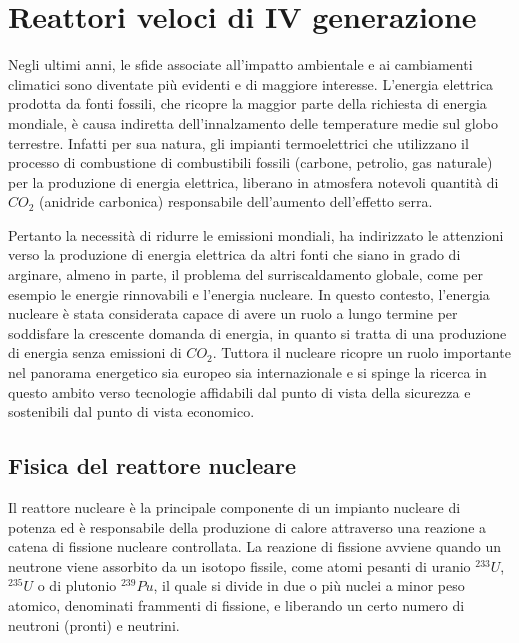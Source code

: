 \chapter{Reattori veloci di IV generazione \label{cap1}}

Negli ultimi anni, le sfide associate all'impatto ambientale e ai cambiamenti 
climatici sono diventate più evidenti e di maggiore interesse.
L'energia elettrica prodotta da fonti fossili, che ricopre la maggior parte 
della richiesta di energia mondiale, è causa indiretta dell'innalzamento delle 
temperature medie sul globo terrestre.
Infatti per sua natura, gli impianti termoelettrici che utilizzano il processo 
di combustione di combustibili fossili (carbone, petrolio, gas naturale) per la 
produzione di energia elettrica, liberano in atmosfera notevoli quantità di 
$CO_2$ (anidride carbonica) responsabile dell'aumento dell'effetto serra.

Pertanto la necessità di ridurre le emissioni mondiali, ha indirizzato le 
attenzioni verso la produzione di energia elettrica da altri fonti che siano in 
grado di arginare, almeno in parte, il problema del surriscaldamento globale, 
come per esempio le energie rinnovabili e l'energia nucleare.
In questo contesto, l'energia nucleare è stata considerata capace di avere un 
ruolo a lungo termine per soddisfare la crescente domanda di energia, in quanto 
si tratta di una produzione di energia senza emissioni di $CO_2$.
Tuttora il nucleare ricopre un ruolo importante nel panorama energetico sia 
europeo sia internazionale e si spinge la ricerca in questo ambito verso 
tecnologie affidabili dal punto di vista della sicurezza e sostenibili dal 
punto 
di vista economico. \cite{overview}

\section{Fisica del reattore nucleare}

Il reattore nucleare è la principale componente di un impianto nucleare di 
potenza ed è responsabile della produzione di calore attraverso una reazione a 
catena di fissione nucleare controllata. 
La reazione di fissione avviene quando un neutrone viene assorbito da un 
isotopo 
fissile, come atomi pesanti di uranio $^{233}U$, $^{235}U$ o di plutonio 
$^{239}Pu$, il quale si divide in due o più nuclei a minor peso atomico, denominati 
frammenti di fissione, e liberando un certo numero di neutroni (pronti) e 
neutrini.

